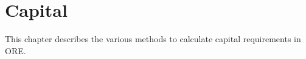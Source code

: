 \chapter{Capital}
This chapter describes the various methods to calculate capital requirements in ORE.







%

%
%
